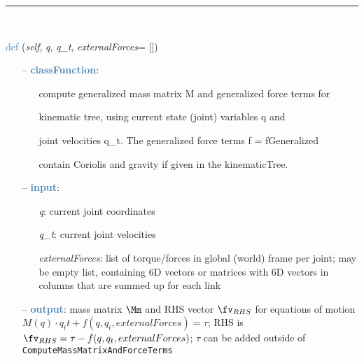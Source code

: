 \begin{itemize}[leftmargin=1.4cm]
\begin{itemize}[leftmargin=0.5cm]
\begin{itemize}[leftmargin=1.4cm]
\begin{itemize}[leftmargin=1.4cm]
\begin{itemize}[leftmargin=0.5cm]
\begin{itemize}[leftmargin=1.4cm]
\begin{itemize}[leftmargin=0.5cm]
\begin{itemize}[leftmargin=1.4cm]
\begin{itemize}[leftmargin=1.4cm]
\begin{itemize}[leftmargin=1.4cm]
%
\noindent\rule{8cm}{0.75pt}\vspace{1pt} \\ 
\begin{flushleft}
\noindent \textcolor{steelblue}{def {\bf {}}}\label{sec:kinematicTree:KinematicTree:ComputeMassMatrixAndForceTerms}
({\it self}, {\it q}, {\it q\_t}, {\it externalForces}= [])
\end{flushleft}
\setlength{\itemindent}{0.7cm}
\begin{itemize}[leftmargin=0.7cm]
  \item[--]  \textcolor{steelblue}{\bf classFunction}: \vspace{-6pt}
  \begin{itemize}[leftmargin=1.2cm]
\setlength{\itemindent}{-0.7cm}
    \item[] compute generalized mass matrix M and generalized force terms for
    \item[]             kinematic tree, using current state (joint) variables q and
    \item[]             joint velocities q\_t. The generalized force terms f = fGeneralized
    \item[]             contain Coriolis and gravity if given in the kinematicTree.
  \end{itemize}
  \item[--]  \textcolor{steelblue}{\bf input}: \vspace{-6pt}
  \begin{itemize}[leftmargin=1.2cm]
\setlength{\itemindent}{-0.7cm}
    \item[] {\it q}: current joint coordinates
    \item[] {\it   q\_t}: current joint velocities
    \item[] {\it   externalForces}: list of torque/forces in global (world) frame per joint; may be empty list, containing 6D vectors or matrices with 6D vectors in columns that are summed up for each link
  \end{itemize}
  \item[--]  \textcolor{steelblue}{\bf output}: mass matrix $\Mm$ and RHS vector $\fv_{RHS}$ for equations of motion $M(q) \cdot q_tt + f(q,q_t,externalForces) = \tau$; RHS is $\fv_{RHS}=\tau - f(q,q_t,externalForces)$; $\tau$ can be added outside of \texttt{ComputeMassMatrixAndForceTerms}\vspace{12pt}\end{itemize}

\end{itemize}
\end{itemize}
\end{itemize}
\end{itemize}
\end{itemize}
\end{itemize}
\end{itemize}
\end{itemize}
\end{itemize}
\end{itemize}

